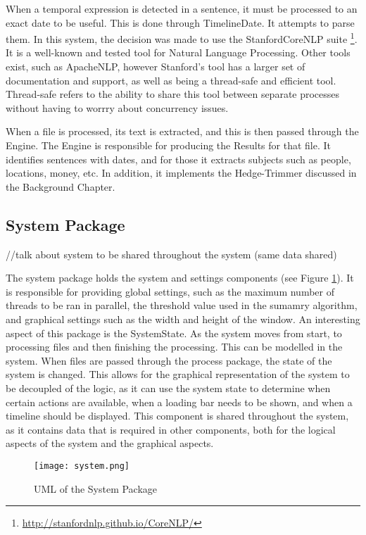 \par When a temporal expression is detected in a sentence, it must be processed to an exact date to be useful. This is done through TimelineDate. It attempts to parse them. In this system, the decision was made to use the StanfordCoreNLP suite \footnote{\url{http://stanfordnlp.github.io/CoreNLP/}}. It is a well-known and tested tool for Natural Language Processing. Other tools exist, such as ApacheNLP, however Stanford's tool has a larger set of documentation and support, as well as being a thread-safe and efficient tool. Thread-safe refers to the ability to share this tool between separate processes without having to worrry about concurrency issues. 
\par When a file is processed, its text is extracted, and this is then passed through the Engine. The Engine is responsible for producing the Results for that file. It identifies sentences with dates, and for those it extracts subjects such as people, locations, money, etc. In addition, it implements the Hedge-Trimmer discussed in the Background Chapter.
\subsection{System Package}
//talk about system to be shared throughout the system (same data shared)
\par The system package holds the system and settings components (see Figure \ref{fig:system}). It is responsible for providing global settings, such as the maximum number of threads to be ran in parallel, the threshold value used in the sumamry algorithm, and graphical settings such as the width and height of the window. An interesting aspect of this package is the SystemState. As the system moves from start, to processing files and then finishing the processing. This can be modelled in the system. When files are passed through the process package, the state of the system is changed. This allows for the graphical representation of the system to be decoupled of the logic, as it can use the system state to determine when certain actions are available, when a loading bar needs to be shown, and when a timeline should be displayed. This component is shared throughout the system, as it contains data that is required in other components, both for the logical aspects of the system and the graphical aspects.
\begin{figure}[H]
\caption{UML of the System Package}
\label{fig:system}
\texttt{[image: system.png]}
\end{figure}
